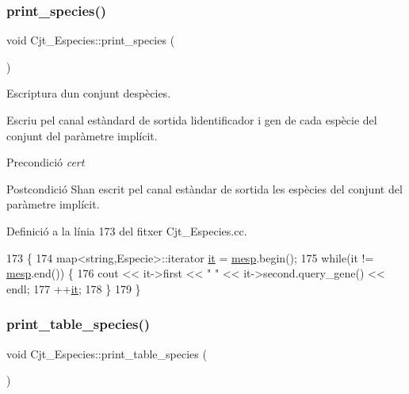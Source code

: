 \subsubsection{\texorpdfstring{print\+\_\+species()}{print\_species()}}
{\footnotesize\ttfamily void Cjt\+\_\+\+Especies\+::print\+\_\+species (\begin{DoxyParamCaption}{ }\end{DoxyParamCaption})}



Escriptura d\textquotesingle{}un conjunt d\textquotesingle{}espècies. 

Escriu pel canal estàndard de sortida l\textquotesingle{}identificador i gen de cada espècie del conjunt del paràmetre implícit.

\begin{DoxyPrecond}{Precondició}
{\itshape cert} 
\end{DoxyPrecond}
\begin{DoxyPostcond}{Postcondició}
S\textquotesingle{}han escrit pel canal estàndar de sortida les espècies del conjunt del paràmetre implícit. 
\end{DoxyPostcond}


Definició a la línia 173 del fitxer Cjt\+\_\+\+Especies.\+cc.


\begin{DoxyCode}
173                                  \{
174     map<string,Especie>::iterator \hyperlink{class_cjt___especies_a25b19415a21bdabe9e2fc2ad7d2f68a5}{it} = \hyperlink{class_cjt___especies_a64a525b38c78935e7432b362ea9a2306}{mesp}.begin();
175     \textcolor{keywordflow}{while}(it != \hyperlink{class_cjt___especies_a64a525b38c78935e7432b362ea9a2306}{mesp}.end()) \{
176         cout << it->first << \textcolor{stringliteral}{" "} << it->second.query\_gene() << endl;
177         ++\hyperlink{class_cjt___especies_a25b19415a21bdabe9e2fc2ad7d2f68a5}{it};
178     \}
179 \}
\end{DoxyCode}
\mbox{\label{class_cjt___especies_ab6ebf81bf6ad734a970c3677fd4e5250}} 
\subsubsection{\texorpdfstring{print\+\_\+table\+\_\+species()}{print\_table\_species()}}
{\footnotesize\ttfamily void Cjt\+\_\+\+Especies\+::print\+\_\+table\+\_\+species (\begin{DoxyParamCaption}{ }\end{DoxyParamCaption})}



